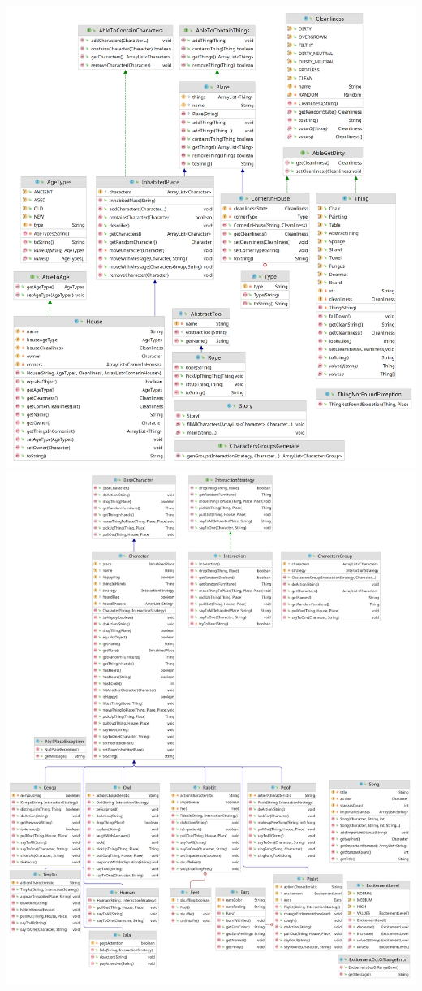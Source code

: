\begin{center}
\includegraphics[width=0.5\linewidth]{imgs/lab4/lab4_diagram_1.png}
\includegraphics[width=0.5\linewidth]{imgs/lab4/lab4_diagram_2.png}
\end{center}
